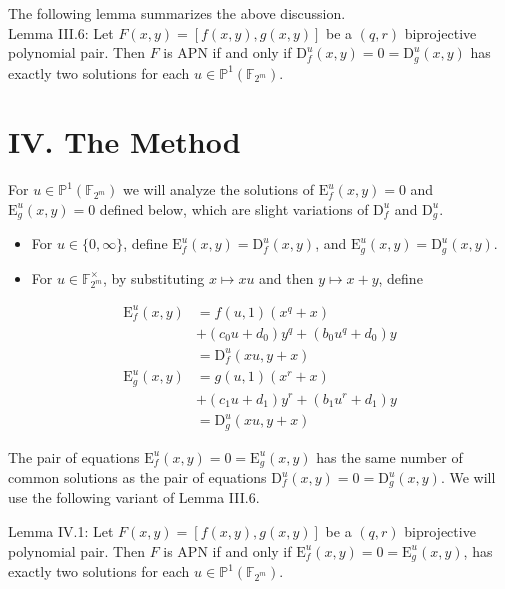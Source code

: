 \documentclass[10pt]{article}
\begin{document}
The following lemma summarizes the above discussion.\\
Lemma III.6: Let $F(x, y)=[f(x, y), g(x, y)]$ be a $(q, r)$ biprojective polynomial pair. Then $F$ is APN if and only if $\mathrm{D}_{f}^{u}(x, y)=0=\mathrm{D}_{g}^{u}(x, y)$ has exactly two solutions for each $u \in \mathbb{P}^{1}\left(\mathbb{F}_{2^{m}}\right)$.

\section*{IV. The Method}
For $u \in \mathbb{P}^{1}\left(\mathbb{F}_{2^{m}}\right)$ we will analyze the solutions of $\mathrm{E}_{f}^{u}(x, y)=0$ and $\mathrm{E}_{g}^{u}(x, y)=0$ defined below, which are slight variations of $\mathrm{D}_{f}^{u}$ and $\mathrm{D}_{g}^{u}$.

\begin{itemize}
  \item For $u \in\{0, \infty\}$, define $\mathrm{E}_{f}^{u}(x, y)=\mathrm{D}_{f}^{u}(x, y)$, and $\mathrm{E}_{g}^{u}(x, y)=\mathrm{D}_{g}^{u}(x, y)$.
  \item For $u \in \mathbb{F}_{2^{m}}^{\times}$, by substituting $x \mapsto x u$ and then $y \mapsto x+y$, define
\end{itemize}

$$
\begin{aligned}
\mathrm{E}_{f}^{u}(x, y) & =f(u, 1)\left(x^{q}+x\right) \\
& +\left(c_{0} u+d_{0}\right) y^{q}+\left(b_{0} u^{q}+d_{0}\right) y \\
& =\mathrm{D}_{f}^{u}(x u, y+x) \\
\mathrm{E}_{g}^{u}(x, y) & =g(u, 1)\left(x^{r}+x\right) \\
& +\left(c_{1} u+d_{1}\right) y^{r}+\left(b_{1} u^{r}+d_{1}\right) y \\
& =\mathrm{D}_{g}^{u}(x u, y+x)
\end{aligned}
$$

The pair of equations $\mathrm{E}_{f}^{u}(x, y)=0=\mathrm{E}_{g}^{u}(x, y)$ has the same number of common solutions as the pair of equations $\mathrm{D}_{f}^{u}(x, y)=0=\mathrm{D}_{g}^{u}(x, y)$. We will use the following variant of Lemma III.6.

Lemma IV.1: Let $F(x, y)=[f(x, y), g(x, y)]$ be a $(q, r)$ biprojective polynomial pair. Then $F$ is APN if and only if $\mathrm{E}_{f}^{u}(x, y)=0=\mathrm{E}_{g}^{u}(x, y)$, has exactly two solutions for each $u \in \mathbb{P}^{1}\left(\mathbb{F}_{2^{m}}\right)$.
\end{document}
